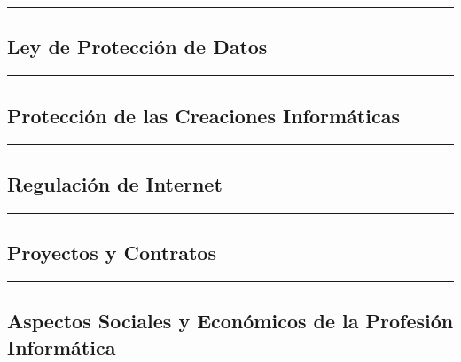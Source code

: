 \documentclass[spanish, 12pt, a4paper, twoside]{article}
\begin{document}
\hrule \break
\subsection{Ley de Protección de Datos}

\hrule \break
\subsection{Protección de las Creaciones Informáticas}

\hrule \break
\subsection{Regulación de Internet}

\hrule \break
\subsection{Proyectos y Contratos}

\hrule \break
\subsection{Aspectos Sociales y Económicos de la Profesión Informática}
\end{document}
